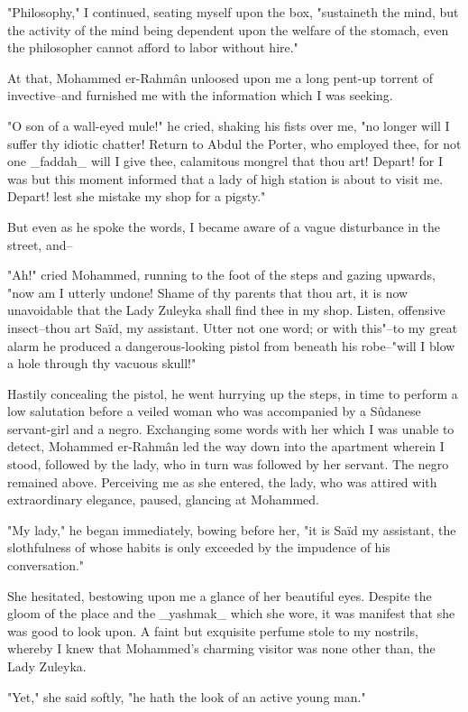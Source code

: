 "Philosophy," I continued, seating myself upon the box, "sustaineth
the mind, but the activity of the mind being dependent upon the
welfare of the stomach, even the philosopher cannot afford to labor
without hire."

At that, Mohammed er-Rahmân unloosed upon me a long pent-up torrent of
invective--and furnished me with the information which I was seeking.

"O son of a wall-eyed mule!" he cried, shaking his fists over me, "no
longer will I suffer thy idiotic chatter! Return to Abdul the Porter,
who employed thee, for not one _faddah_ will I give thee, calamitous
mongrel that thou art! Depart! for I was but this moment informed that
a lady of high station is about to visit me. Depart! lest she mistake
my shop for a pigsty."

But even as he spoke the words, I became aware of a vague disturbance
in the street, and--

"Ah!" cried Mohammed, running to the foot of the steps and gazing
upwards, "now am I utterly undone! Shame of thy parents that thou
art, it is now unavoidable that the Lady Zuleyka shall find thee
in my shop. Listen, offensive insect--thou art Saïd, my assistant.
Utter not one word; or with this"--to my great alarm he produced
a dangerous-looking pistol from beneath his robe--"will I blow a
hole through thy vacuous skull!"

Hastily concealing the pistol, he went hurrying up the steps, in time
to perform a low salutation before a veiled woman who was accompanied
by a Sûdanese servant-girl and a negro. Exchanging some words with her
which I was unable to detect, Mohammed er-Rahmân led the way down into
the apartment wherein I stood, followed by the lady, who in turn was
followed by her servant. The negro remained above. Perceiving me as
she entered, the lady, who was attired with extraordinary elegance,
paused, glancing at Mohammed.

"My lady," he began immediately, bowing before her, "it is Saïd my
assistant, the slothfulness of whose habits is only exceeded by the
impudence of his conversation."

She hesitated, bestowing upon me a glance of her beautiful eyes.
Despite the gloom of the place and the _yashmak_ which she wore, it
was manifest that she was good to look upon. A faint but exquisite
perfume stole to my nostrils, whereby I knew that Mohammed's charming
visitor was none other than, the Lady Zuleyka.

"Yet," she said softly, "he hath the look of an active young man."

